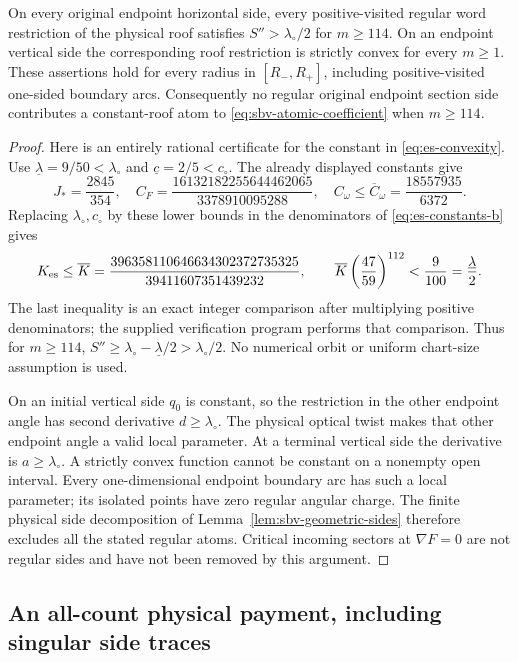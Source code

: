 \begin{theorem}
\label{thm:es-no-atoms}
On every original endpoint horizontal side, every positive-visited
regular word restriction of the physical roof satisfies
$S''>\lambda_\circ/2$ for $m\ge114$.  On an endpoint vertical
side the corresponding roof restriction is strictly convex for
every $m\ge1$.  These assertions hold for every radius in
$[R_-,R_+]$, including positive-visited one-sided boundary arcs.
Consequently no regular original endpoint section side contributes
a constant-roof atom to \eqref{eq:sbv-atomic-coefficient} when
$m\ge114$.
\end{theorem}
\begin{proof}
Here is an entirely rational certificate for the constant in
\eqref{eq:es-convexity}.  Use
$\underline\lambda=9/50<\lambda_\circ$ and
$\underline c=2/5<c_\circ$.  The already displayed constants give
\[
 J_*=\frac{2845}{354},\quad
 C_F=\frac{16132182255644462065}{3378910095288},\quad
 C_\omega\le\overline C_\omega=\frac{18557935}{6372}.
\]
Replacing $\lambda_\circ,c_\circ$ by these lower bounds in the
denominators of \eqref{eq:es-constants-b} gives
\[
 K_{\rm es}\le\overline K
 =\frac{396358110646634302372735325}{39411607351439232},
 \qquad
 \overline K\left(\frac{47}{59}\right)^{112}
       <\frac9{100}=\frac{\underline\lambda}{2}.
\]
The last inequality is an exact integer comparison after multiplying
positive denominators; the supplied verification program performs
that comparison.  Thus for $m\ge114$,
$S''\ge\lambda_\circ-\underline\lambda/2
>\lambda_\circ/2$.  No numerical orbit or uniform chart-size
assumption is used.

On an initial vertical side $q_0$ is constant, so the restriction
in the other endpoint angle has second derivative $d\ge
\lambda_\circ$.  The physical optical twist makes that other
endpoint angle a valid local parameter.  At a terminal vertical
side the derivative is $a\ge\lambda_\circ$.  A strictly convex
function cannot be constant on a nonempty open interval.  Every
one-dimensional endpoint boundary arc has such a local parameter;
its isolated points have zero regular angular charge.  The
finite physical side decomposition of Lemma~\ref{lem:sbv-geometric-sides}
therefore excludes all the stated regular atoms.  Critical
incoming sectors at $\nabla F=0$ are not regular sides and have
not been removed by this argument.
\end{proof}

\subsection{An all-count physical payment, including singular side traces}

